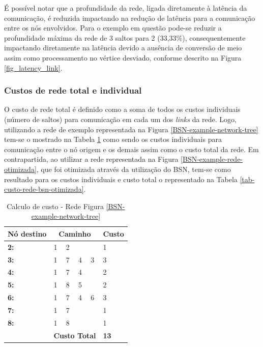\documentclass[conference]{IEEEtran}
\begin{document}
É possível notar que a profundidade da rede, ligada diretamente à latência da comunicação, é reduzida impactando na redução de latência para a comunicação entre os nós envolvidos. Para o exemplo em questão pode-se reduzir a profundidade máxima da rede de 3 saltos para 2 (33,33\%), consequentemente impactando diretamente na latência devido a ausência de conversão de meio assim como processamento no vértice desviado, conforme descrito na Figura \ref{fig_latency_link}. 

\subsubsection{Custos de rede total e individual}
O custo de rede total é definido como a soma de todos os custos individuais (número de saltos) para comunicação em cada um dos \emph{links} da rede. Logo, utilizando a rede de exemplo representada na Figura \ref{BSN-example-network-tree} tem-se o mostrado na Tabela \ref{tab-custo-rede-BSN-example-network-tree} como sendo os custos individuais para comunicação entre o nó origem e os demais assim como o custo total da rede. Em contrapartida, ao utilizar a rede representada na Figura \ref{BSN-example-rede-otimizada}, que foi otimizada através da utilização do BSN, tem-se como resultado para os custos individuais e custo total o representado na Tabela \ref{tab-custo-rede-bsn-otimizada}.

\begin{table}[t!]
	\centering
			\begin{tabular}{llllll}
			\hline
			\multicolumn{1}{|l|}{\textbf{Nó destino}} & \multicolumn{4}{c}{\textbf{Caminho}} & \multicolumn{1}{c|}{\textbf{Custo}} \\ \hline
			\multicolumn{1}{|l|}{\textbf{2:}} & 1 & 2 &  & \multicolumn{1}{l|}{} & \multicolumn{1}{l|}{1} \\ \hline
			\multicolumn{1}{|l|}{\textbf{3:}} & 1 & 7 & 4 & \multicolumn{1}{l|}{3} & \multicolumn{1}{l|}{3} \\ \hline
			\multicolumn{1}{|l|}{\textbf{4:}} & 1 & 7 & 4 & \multicolumn{1}{l|}{} & \multicolumn{1}{l|}{2} \\ \hline
			\multicolumn{1}{|l|}{\textbf{5:}} & 1 & 8 & 5 & \multicolumn{1}{l|}{} & \multicolumn{1}{l|}{2} \\ \hline
			\multicolumn{1}{|l|}{\textbf{6:}} & 1 & 7 & 4 & \multicolumn{1}{l|}{6} & \multicolumn{1}{l|}{3} \\ \hline
			\multicolumn{1}{|l|}{\textbf{7:}} & 1 & 7 &  & \multicolumn{1}{l|}{} & \multicolumn{1}{l|}{1} \\ \hline
			\multicolumn{1}{|l|}{\textbf{8:}} & 1 & 8 &  & \multicolumn{1}{l|}{} & \multicolumn{1}{l|}{1} \\ \hline
			 & \multicolumn{4}{l}{\textbf{Custo Total}} & \textbf{13}
			\end{tabular}
		\caption{Calculo de custo - Rede Figura \ref{BSN-example-network-tree}}
		\label{tab-custo-rede-BSN-example-network-tree}
\end{table}
		
\end{document}
